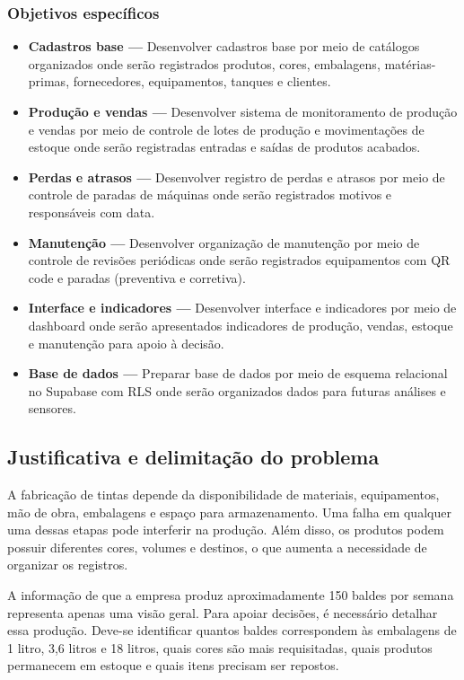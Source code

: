 \documentclass[12pt,a4paper]{article}
\begin{document}
\subsubsection*{Objetivos específicos}
\begin{itemize}
\item \textbf{Cadastros base —} Desenvolver cadastros base por meio de catálogos organizados onde serão registrados produtos, cores, embalagens, matérias-primas, fornecedores, equipamentos, tanques e clientes.
\item \textbf{Produção e vendas —} Desenvolver sistema de monitoramento de produção e vendas por meio de controle de lotes de produção e movimentações de estoque onde serão registradas entradas e saídas de produtos acabados.
\item \textbf{Perdas e atrasos —} Desenvolver registro de perdas e atrasos por meio de controle de paradas de máquinas onde serão registrados motivos e responsáveis com data.
\item \textbf{Manutenção —} Desenvolver organização de manutenção por meio de controle de revisões periódicas onde serão registrados equipamentos com QR code e paradas (preventiva e corretiva).
\item \textbf{Interface e indicadores —} Desenvolver interface e indicadores por meio de dashboard onde serão apresentados indicadores de produção, vendas, estoque e manutenção para apoio à decisão.
\item \textbf{Base de dados —} Preparar base de dados por meio de esquema relacional no Supabase com RLS onde serão organizados dados para futuras análises e sensores.
\end{itemize}

\subsection{Justificativa e delimitação do problema}
A fabricação de tintas depende da disponibilidade de materiais, equipamentos, mão de obra, embalagens e espaço para armazenamento. Uma falha em qualquer uma dessas etapas pode interferir na produção. Além disso, os produtos podem possuir diferentes cores, volumes e destinos, o que aumenta a necessidade de organizar os registros.

A informação de que a empresa produz aproximadamente 150 baldes por semana representa apenas uma visão geral. Para apoiar decisões, é necessário detalhar essa produção. Deve-se identificar quantos baldes correspondem às embalagens de 1 litro, 3,6 litros e 18 litros, quais cores são mais requisitadas, quais produtos permanecem em estoque e quais itens precisam ser repostos.
\end{document}
